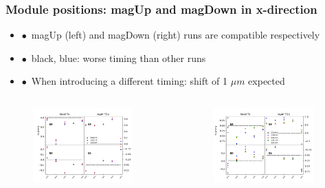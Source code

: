 \documentclass[aspectratio=1610, 12pt]{beamer}
\begin{document}
\begin{frame}\frametitle{Module positions: magUp and magDown in x-direction}
  \begin{itemize}
    \setlength\itemsep{0em}
    \item $\bullet$\, magUp (left) and magDown (right) runs are compatible respectively
    \item $\bullet$\, black, blue: worse timing than other runs
    \item $\bullet$\, When introducing a different timing: shift of 1 $\mu m$ expected
  \end{itemize}
  \begin{columns}
    \begin{column}[c]{0.48\textwidth}
      \begin{figure}
        \includegraphics[width=0.9\textwidth]{plots/plain_data/raw_MU_T1U_Tx.pdf}
      \end{figure}
    \end{column}
    \begin{column}[c]{0.48\textwidth}
      \begin{figure}
        \includegraphics[width=0.9\textwidth]{plots/plain_data/raw_MD_T1U_Tx.pdf}
      \end{figure}
    \end{column}
  \end{columns}
\end{frame}
\end{document}

